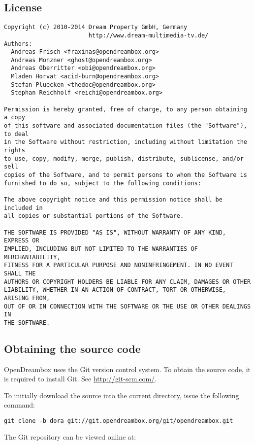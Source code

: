 \documentclass[a4paper]{article}
\newcommand{\shell}[1]{\texttt{\small #1}}
\begin{document}
  \subsection{License}

    \begin{verbatim}
Copyright (c) 2010-2014 Dream Property GmbH, Germany
                        http://www.dream-multimedia-tv.de/
Authors:
  Andreas Frisch <fraxinas@opendreambox.org>
  Andreas Monzner <ghost@opendreambox.org>
  Andreas Oberritter <obi@opendreambox.org>
  Mladen Horvat <acid-burn@opendreambox.org>
  Stefan Pluecken <thedoc@opendreambox.org>
  Stephan Reichholf <reichi@opendreambox.org>

Permission is hereby granted, free of charge, to any person obtaining a copy
of this software and associated documentation files (the "Software"), to deal
in the Software without restriction, including without limitation the rights
to use, copy, modify, merge, publish, distribute, sublicense, and/or sell
copies of the Software, and to permit persons to whom the Software is
furnished to do so, subject to the following conditions:

The above copyright notice and this permission notice shall be included in
all copies or substantial portions of the Software.

THE SOFTWARE IS PROVIDED "AS IS", WITHOUT WARRANTY OF ANY KIND, EXPRESS OR
IMPLIED, INCLUDING BUT NOT LIMITED TO THE WARRANTIES OF MERCHANTABILITY,
FITNESS FOR A PARTICULAR PURPOSE AND NONINFRINGEMENT. IN NO EVENT SHALL THE
AUTHORS OR COPYRIGHT HOLDERS BE LIABLE FOR ANY CLAIM, DAMAGES OR OTHER
LIABILITY, WHETHER IN AN ACTION OF CONTRACT, TORT OR OTHERWISE, ARISING FROM,
OUT OF OR IN CONNECTION WITH THE SOFTWARE OR THE USE OR OTHER DEALINGS IN
THE SOFTWARE.
    \end{verbatim}

  \subsection{Obtaining the source code}
    OpenDreambox uses the Git version control system. To obtain the source
    code, it is required to install Git. See \url{http://git-scm.com/}.

    To initially download the source into the current directory, issue the
    following command:

    \shell{git clone -b dora git://git.opendreambox.org/git/opendreambox.git}

    The Git repository can be viewed online at:
\end{document}
